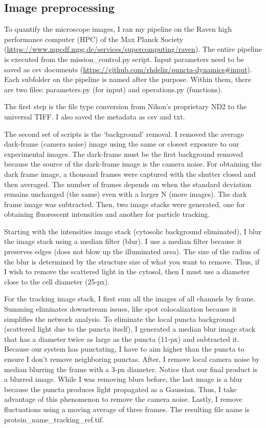 \newpage
\subsection{Image preprocessing}
To quantify the microscope images, I ran my pipeline on the Raven high performance computer (HPC) of the Max Planck Society (\url{https://www.mpcdf.mpg.de/services/supercomputing/raven}). The entire pipeline is executed from the mission\_control.py script. Input parameters need to be saved as csv documents (\url{https://github.com/rhdeliz/puncta-dynamics\#input}). Each subfolder on the pipeline is named after the purpose. Within them, there are two files: parameters.py (for input) and operations.py (functions).

The first step is the file type conversion from Nikon's proprietary ND2 to the universal TIFF. I also saved the metadata as csv and txt.

The second set of scripts is the ‘background’ removal. I removed the average dark-frame (camera noise) image using the same or closest exposure to our experimental images. The dark-frame must be the first background removed because the source of the dark-frame image is the camera noise. For obtaining the dark frame image, a thousand frames were captured with the shutter closed and then averaged. The number of frames depends on when the standard deviation remains unchanged (the same) even with a larger N (more images). The dark frame image was subtracted. Then, two image stacks were generated, one for obtaining fluorescent intensities and another for particle tracking.

Starting with the intensities image stack (cytosolic background eliminated), I blur the image stack using a median filter (blur). I use a median filter because it preserves edges (does not blow up the illuminated area). The size of the radius of the blur is determined by the structure size of what you want to remove. Thus, if I wish to remove the scattered light in the cytosol, then I must use a diameter close to the cell diameter (25-px).

For the tracking image stack, I first sum all the images of all channels by frame. Summing eliminates downstream issues, like spot colocalization because it simplifies the network analysis. To eliminate the local puncta background (scattered light due to the puncta itself), I generated a median blur image stack that has a diameter twice as large as the puncta (11-px) and subtracted it. Because our system has punctating, I have to aim higher than the puncta to ensure I don’t remove neighboring punctas. After, I remove local camera noise by median blurring the frame with a 3-px diameter. Notice that our final product is a blurred image. While I was removing blurs before, the last image is a blur because the puncta produces light propagated as a Gaussian. Thus, I take advantage of this phenomenon to remove the camera noise. Lastly, I remove fluctuations using a moving average of three frames. The resulting file name is protein\_name\_tracking\_ref.tif.

